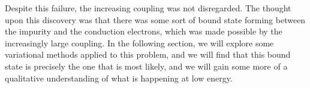 Despite this failure, the increasing coupling was not disregarded. The thought upon this discovery was that there was some sort of bound state forming between the impurity and the conduction electrons, which was made possible by the increasingly large coupling. In the following section, we will explore some variational methods applied to this problem, and we will find that this bound state is precisely the one that is most likely, and we will gain some more of a qualitative understanding of what is happening at low energy.




